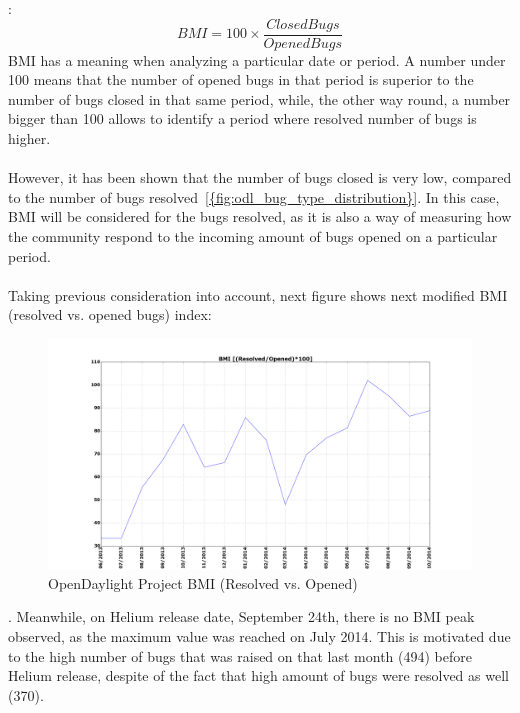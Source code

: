 \documentclass[a4paper, 12pt]{book}
\begin{document}
{: \[BMI = 100\times\dfrac{Closed Bugs}{Opened Bugs}\]
BMI has a meaning when analyzing a particular date or period. A number under 100 means that the number of opened bugs in that period is superior to the number of bugs closed in that same period, while, the other way round, a number bigger than 100 allows to identify a period where resolved number of bugs is higher.\\
\\
However, it has been shown that the number of bugs closed is very low, compared to the number of bugs resolved~\ref{{fig:odl_bug_type_distribution}}. In this case, BMI will be considered for the bugs resolved, as it is also a way of measuring how the community respond to the incoming amount of bugs opened on a particular period.\\
\\
Taking previous consideration into account, next figure shows next modified BMI (resolved vs. opened bugs) index:
\begin{center}
 \begin{figure}[H]
 \begin{center}
   \includegraphics[width=17cm]{img/bmi_resolved_vs_opened_01.png}
   \caption{OpenDaylight Project BMI (Resolved vs. Opened)}
   \label{fig:odl_bugs_resolved_month}
 \end{center}
 \end{figure}
\end{center}
. Meanwhile, on Helium release date, September 24th, there is no BMI peak observed, as the maximum value was reached on July 2014. This is motivated due to the high number of bugs that was raised on that last month (494) before Helium release, despite of the fact that high amount of bugs were resolved as well (370).\\
}
\end{document}

